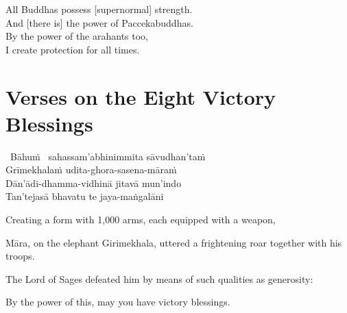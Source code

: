 \begin{english-verses}
  All Buddhas possess [supernormal] strength.\\
  And [there is] the power of Paccekabuddhas.\\
  By the power of the arahants too,\\
  I create protection for all times.
\end{english-verses}

\suttaRef{[MJG]}



\section{Verses on the Eight Victory Blessings}
\label{eight-victory-blessings}

\begin{pali-hang-together}
  \anglebracketleft\ \hspace{-0.5mm}Bāhuṁ \hspace{-0.5mm}\anglebracketright\ sahassam'abhinimmita sāvudhan'taṁ\\
  Grīmekhalaṁ udita-ghora-sasena-māraṁ\\
  Dān'ādi-dhamma-vidhinā jitavā\makeatletter\hyperlink{endnote129-appendix}\makeatother
  mun'indo\\
  Tan'tejasā bhavatu te jaya-maṅgalāni
\end{pali-hang-together}

\begin{english-verses}
  \begin{english-hang-first-line}
  Creating a form with 1,000 arms, each equipped with a weapon,
  \end{english-hang-first-line}
  \begin{english-hang-together-verses}
    Māra, on the elephant Girimekhala, uttered a frightening roar together with his troops.
  \end{english-hang-together-verses}
  \begin{english-hang-together-verses}
    The Lord of Sages defeated him by means of such qualities as generosity:
  \end{english-hang-together-verses}
  By the power of this, may you have victory blessings.
\end{english-verses}

